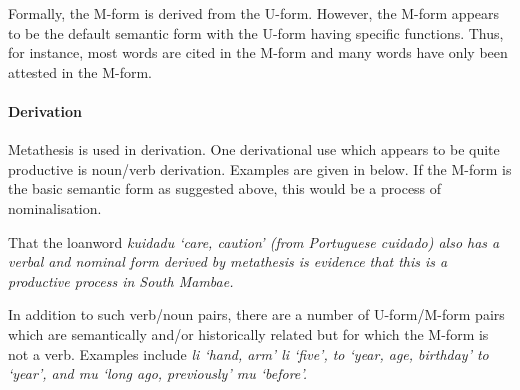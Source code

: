 Formally, the M-form is derived from the U-form.
However, the M-form appears to be the default semantic
form with the U-form having specific functions.
Thus, for instance, most words are cited in the M-form
and many words have only been attested in the M-form.

\paragraph{Derivation}
Metathesis is used in derivation.
One derivational use which appears to
be quite productive is noun/verb derivation.
Examples are given in  below.
If the M-form is the basic semantic form
as suggested above, this would be a process of nominalisation.

\begin{exe}
	\label{ex:MamVerDer}
\end{exe}

That the loanword \it{kuidadu} `care, caution'
(from Portuguese \it{cuidado}) also has a
verbal and nominal form derived by metathesis
is evidence that this is
a productive process in South Mambae.

In addition to such verb/noun pairs, there are a number
of U-form/M-form pairs which are semantically
and/or historically related but for which the M-form is not a verb.
Examples include \it{li} `hand, arm' \it{li} `five',
\it{to} `year, age, birthday' \it{to} `year',
and \it{mu} `long ago, previously' \it{mu} `before'.

